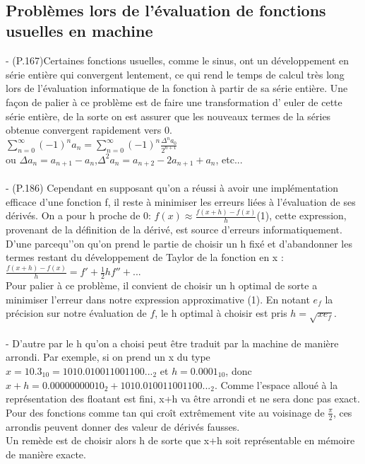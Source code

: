 \documentclass{article}
\begin{document}
\\

\subsection*{Problèmes lors de l’évaluation de fonctions usuelles en machine}

- (P.167)Certaines fonctions usuelles, comme le sinus, ont un développement en série entière qui convergent lentement, ce qui rend le temps de calcul très long lors de l'évaluation informatique de la fonction à partir de sa série entière. Une façon de palier à ce problème est de faire une transformation d' euler de cette série entière, de la sorte on est assurer que les nouveaux termes de la séries obtenue convergent rapidement vers 0.\\
$\sum_{n=0}^\infty (-1)^n a_n = \sum_{n=0}^\infty (-1)^n \frac {\Delta^n a_0} {2^{n+1}}$
\\ ou $\Delta a_n=a_{n+1}-a_n$,$\Delta^2 a_n=a_{n+2}-2a_{n+1}+a_n$, etc...\\
\\
- (P.186) Cependant en supposant  qu'on a réussi à avoir une implémentation efficace d'une fonction f, il reste à minimiser les erreurs liées à l'évaluation de ses dérivés. On a pour h proche de 0: $f(x)\approx\frac{f(x+h)-f(x)}{h}$(1), cette expression, provenant de la définition de la dérivé, est source d'erreurs informatiquement. D'une parcequ’'on qu'on prend le partie de choisir un h fixé et d’abandonner les termes restant du développement de Taylor de la fonction en x : $\frac{f(x+h)-f(x)}{h}=f'+\frac{1}{2}hf''+...$\\
Pour palier à ce problème, il convient de choisir un h optimal de sorte a minimiser l'erreur dans notre expression approximative (1). En notant $e_f$ la précision sur notre évaluation de $f$, le h optimal à choisir est pris $h =
\sqrt{xe_f}$.
\\
\\
- D'autre par le h qu'on a choisi peut être traduit par la machine de manière arrondi. Par exemple, si on prend un x du type $x=10.3_{10} = 1010.010011001100..._2$ et $h=0.0001_{10}$, donc $x+h=0.00000000010_2+1010.010011001100..._2$. Comme l'espace alloué à la représentation des floatant est fini, x+h  va être arrondi et ne sera donc pas exact. Pour des fonctions comme tan qui croît extrêmement vite au voisinage de $\frac{\pi}{2}$, ces arrondis peuvent donner des valeur de dérivés fausses.\\
Un remède est de choisir alors h de sorte que x+h soit représentable en mémoire de manière exacte.
\end{document}
